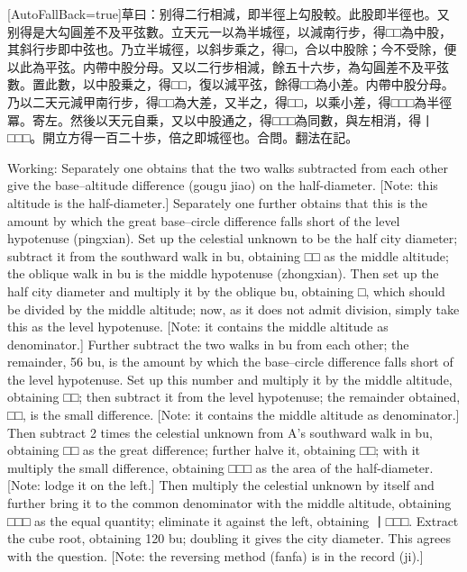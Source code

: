 \documentclass[11pt]{article}
\newcommand{\zhsmall}{\footnotesize\color{black!70}}
\newcommand{\unitlabel}[1]{\marginpar{\raggedleft\tiny\color{gray}#1}}
\newenvironment{unitzh}{\par\CJKfontspec{Noto Serif CJK SC}[AutoFallBack=true]\large\linespread{1.25}\selectfont}{\par}
\newenvironment{uniten}{\par\small\color{black!85}}{\par\medskip}
\begin{document}
\begin{unitzh}\unitlabel{ceyuan-014.34}草曰：别得二行相減，即半徑上勾股較。{\zhsmall 此股即半徑也。}又别得是大勾圓差不及平弦數。立天元一以為半城徑，以減南行步，得□□為中股，其斜行步即中弦也。乃立半城徑，以斜步乘之，得□，合以中股除；今不受除，便以此為平弦。{\zhsmall 内帶中股分母。}又以二行步相減，餘五十六步，為勾圓差不及平弦數。置此數，以中股乗之，得□□，復以減平弦，餘得□□為小差。{\zhsmall 内帶中股分母。}乃以二天元減甲南行步，得□□為大差，又半之，得□□，以乘小差，得□□□為半徑冪。{\zhsmall 寄左。}然後以天元自乗，又以中股通之，得□□□為同數，與左相消，得丨□□□。開立方得一百二十歩，倍之即城徑也。合問。{\zhsmall 翻法在記。}\end{unitzh}
\begin{uniten}Working: Separately one obtains that the two walks subtracted from each other give the base–altitude difference (gougu jiao) on the half-diameter. [Note: this altitude is the half-diameter.] Separately one further obtains that this is the amount by which the great base–circle difference falls short of the level hypotenuse (pingxian). Set up the celestial unknown to be the half city diameter; subtract it from the southward walk in bu, obtaining □□ as the middle altitude; the oblique walk in bu is the middle hypotenuse (zhongxian). Then set up the half city diameter and multiply it by the oblique bu, obtaining □, which should be divided by the middle altitude; now, as it does not admit division, simply take this as the level hypotenuse. [Note: it contains the middle altitude as denominator.] Further subtract the two walks in bu from each other; the remainder, 56 bu, is the amount by which the base–circle difference falls short of the level hypotenuse. Set up this number and multiply it by the middle altitude, obtaining □□; then subtract it from the level hypotenuse; the remainder obtained, □□, is the small difference. [Note: it contains the middle altitude as denominator.] Then subtract 2 times the celestial unknown from A's southward walk in bu, obtaining □□ as the great difference; further halve it, obtaining □□; with it multiply the small difference, obtaining □□□ as the area of the half-diameter. [Note: lodge it on the left.] Then multiply the celestial unknown by itself and further bring it to the common denominator with the middle altitude, obtaining □□□ as the equal quantity; eliminate it against the left, obtaining 丨□□□. Extract the cube root, obtaining 120 bu; doubling it gives the city diameter. This agrees with the question. [Note: the reversing method (fanfa) is in the record (ji).]\end{uniten}
\end{document}
